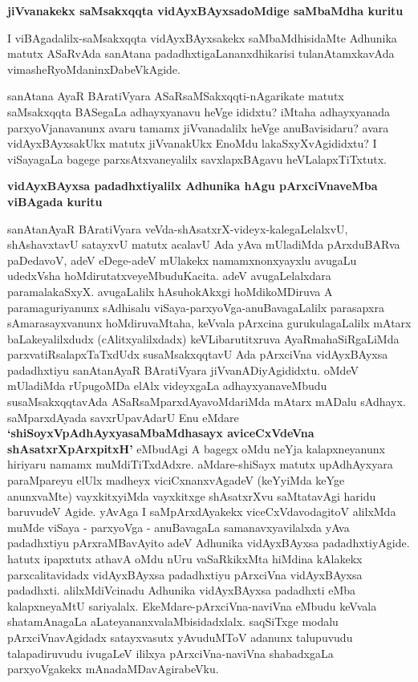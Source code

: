 {\bigskip
\noindent
{\large\bf jiVvanakekx saMsakxqqta vidAyxBAyxsadoMdige saMbaMdha kuritu}}\label{page38}
\medskip

\noindent
I viBAgadalilx-saMsakxqqta vidAyxBAyxsakekx saMbaMdhisidaMte Adhunika matutx ASaRvAda sanAtana padadhxti\-gaLa\-nanxdhi\-karisi tulanAtamxkavAda vimasheRyoMdaninxDabeVkAgide.

sanAtana AyaR BAratiVyara ASaRsaMSakxqqti-nAgarikate matutx saMsakxqqta BASegaLa adhayxyanavu heVge ididxtu? iMtaha adhayxyanada parxyoVjanavanunx avaru tamamx jiVvanadalilx heVge anuBavisidaru? avara vidAyxBAyxsakUkx matutx  jiVvanakUkx EnoMdu lakaSxyXvAgididxtu? I viSayagaLa bagege parxsAtxvaneyalilx savxlapxBAgavu heVLalapxTiTxtutx.

{\bigskip
\noindent
{\large\bf vidAyxBAyxsa padadhxtiyalilx Adhunika hAgu pArxciVnaveMba viBAgada kuritu}}\label{page38}
\medskip

\noindent
sanAtanAyaR BAratiVyara veVda-shAsatxrX-videyx-kalegaLelalxvU, shAshavxtavU satayxvU matutx acalavU Ada yAva mUladiMda pArxduBARva paDedavoV, adeV eDege\--adeV mUlakekx namamxnonxyayxlu avu\-gaLu udedxVsha hoMdirutatxveyeMbudu\break Kacita. adeV avugaLelalxdara paramalakaSxyX. avugaLalilx hAsu\-hokAkxgi hoMdikoMDi\-ruva A paramaguriyanunx sAdhisalu viSaya-parxyoVga-anuBavagaLalilx para\-sapxra sAma\-rasayx\-vanunx hoMdiruvaMtaha, keVvala pArxcina gurukulagaLalilx mAtarx baLake\-yalilxdudx (cAlitx\-yalilxdadx) keVLi\-baru\-titxruva AyaRmahaSiRgaLiMda parxvatiRsa\-lapxTaTxdUdx susaMsakxqqtavU Ada pArxciVna vidAyx\-BAyxsa padadhx\-tiyu sanAtanAyaR BAratiVyara jiVvanADiyAgididxtu. oMdeV mUladiMda rUpu\-goMDa elAlx videyxgaLa adhayx\-yanaveMbudu susaMsakxqqtavAda ASaRsaMparxdAyavoMdariMda mAtarx mADalu sA\-dhayx. saMparx\-dAyada savxrUpavAdarU Enu eMdare {\bf `shiSoyxVpAdhAyxyasaMbaMdhasayx\label{38} aviceCxVdeVna shAsatxrX\-pArxpitxH'} eMbu\-dAgi A bagegx oMdu neYja kalapxneyanunx hiri\-yaru namamx muMdiTiTxdAdxre. aMdare-shiSayx matutx upA\-dhAyxyara paraMpareyu elUlx madheyx viciCxnanxvAgadeV (keYyiMda keYge anunxvaMte) vayxkitxyiMda vayxkitxge shAsatxrXvu saMtatavAgi haridu baruvudeV Agide. yAvAga I saMpArxdAyakekx viceCxVda\-voda\-gitoV alilxMda muMde viSaya - parxyoVga - anuBavagaLa samanavxyavilalxda yAva padadhxtiyu pArxraMBa\-vAyito adeV Adhunika vidAyx\-BAyxsa padadhxtiyAgide. hatutx ipapxtutx athavA oMdu nUru vaSaR\-kikxMta hiMdina kAlakekx parxcalitavidadx vidAyx\-BAyxsa padadhxtiyu pArxciVna vidAyxBAyxsa padadhxti. alilxMdiVcinadu Adhu\-nika vidAyx\-BAyxsa padadhxti eMba kalapxneyaMtU sariyalalx. EkeMdare-pArxciVna-naviVna \hbox{eMbudu} \hbox{keVvala} shata\-mAna\-gaLa aLate\-yananxva\-laMbi\-sidadxlalx. saqSiTxge modalu pArxciVnavAgidadx satayxvasutx yAvu\-duMToV adanunx talupuvudu talapadiru\-vudu ivugaLeV ililxya pArxciVna-naviVna shabadxgaLa parxyoVgakekx mAna\-daMDa\-vAgira\-beVku.

